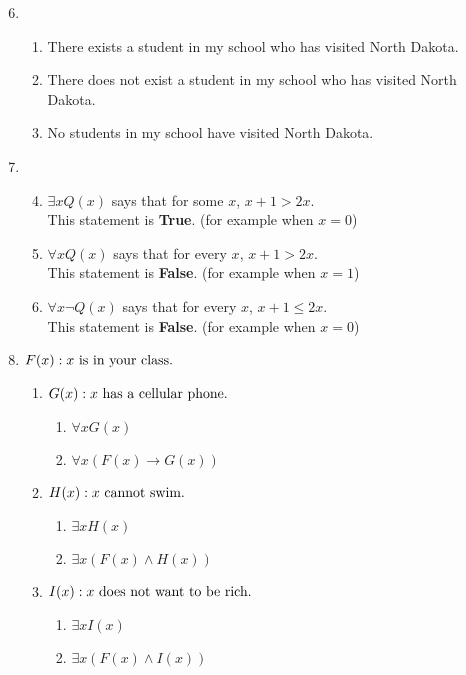 \documentclass[11pt,a4paper,oneside]{article}
\begin{document}
\begin{enumerate}
\setcounter{enumi}{5}
\item %
\begin{enumerate} %
\item There exists a student in my school who has visited North Dakota.
\setcounter{enumii}{2} %
\item There does not exist a student in my school who has visited North Dakota.
\setcounter{enumii}{5} %
\item No students in my school have visited North Dakota.
\end{enumerate}

\setcounter{enumi}{11}
\item %
\begin{enumerate}
\setcounter{enumii}{3} %
\item \( \exists x Q(x) \) says that for some $x$, \( x+1 > 2x \).\\
This statement is {\bf True}. (for example when $x = 0$)
\item \( \forall x Q(x) \) says that for every $x$, \( x+1 > 2x \).\\
This statement is {\bf False}. (for example when $x = 1$)
\setcounter{enumii}{6} %
\item \( \forall x \neg Q(x) \) says that for every $x$, \( x+1 \leq 2x \).\\
This statement is {\bf False}. (for example when $x = 0$)
\end{enumerate}

\setcounter{enumi}{23}
\item \( F(x) : x \textup{ is in your class.} \) %
\begin{enumerate} %
\item \( G(x) : x \textup{ has a cellular phone.} \)
\begin{enumerate}
\item \( \forall x G(x) \)
\item \( \forall x (F(x) \rightarrow G(x)) \)
\end{enumerate}
\setcounter{enumii}{2} %
\item \( H(x) : x \textup{ cannot swim.} \)
\begin{enumerate}
\item \( \exists x H(x) \)
\item \( \exists x (F(x) \wedge H(x)) \)
\end{enumerate}
\setcounter{enumii}{4} %
\item \( I(x) : x \textup{ does not want to be rich.} \)
\begin{enumerate}
\item \( \exists x I(x) \)
\item \( \exists x (F(x) \wedge I(x)) \)
\end{enumerate}
\end{enumerate}


\end{enumerate}
\end{document}
